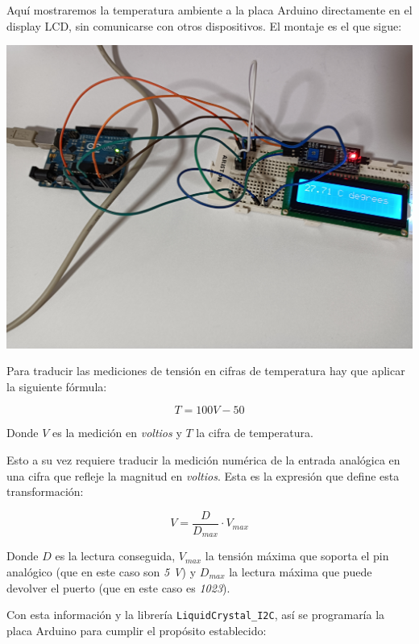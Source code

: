 Aquí mostraremos la temperatura ambiente a la placa Arduino directamente en el
display LCD, sin comunicarse con otros dispositivos. El montaje es el que
sigue:

\includegraphics[width=\linewidth]{temperature-display-wiring.jpg}

Para traducir las mediciones de tensión en cifras de temperatura hay que
aplicar la siguiente fórmula:

\begin{equation*}
T = 100V - 50
\end{equation*}

Donde $V$ es la medición en \emph{voltios} y $T$ la cifra de temperatura.

Esto a su vez requiere traducir la medición numérica de la entrada analógica en
una cifra que refleje la magnitud en \emph{voltios}. Esta es la expresión que
define esta transformación:

\begin{equation*}
V = \frac{D}{D_{max}} \cdot V_{max}
\end{equation*}

Donde $D$ es la lectura conseguida, $V_{max}$ la tensión máxima que soporta el
pin analógico (que en este caso son \emph{5 V}) y $D_{max}$ la lectura máxima
que puede devolver el puerto (que en este caso es \emph{1023}).

Con esta información y la librería \verb|LiquidCrystal_I2C|\footnotemark, así
se programaría la placa Arduino para cumplir el propósito establecido:


